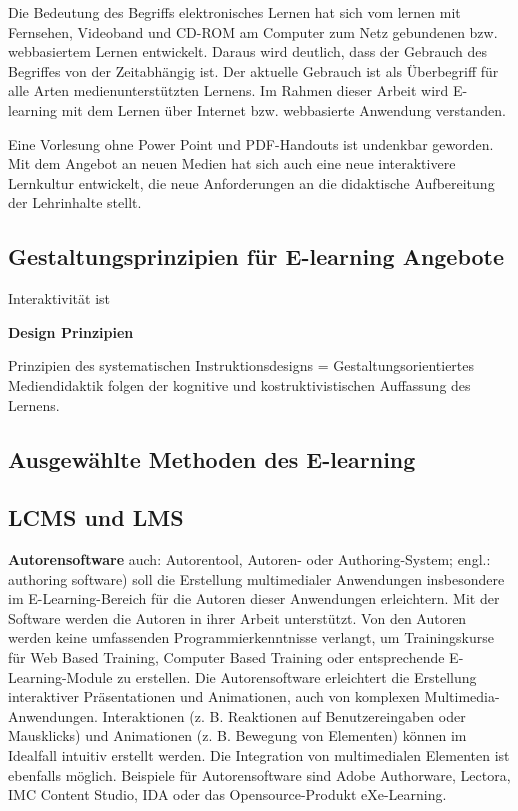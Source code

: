 \documentclass[a4paper, 12pt, twoside, BCOR=20mm, DIV=calc, abstracton, parskip=half*, toc=bibliography, toc=listof, headsepline, footsepline, headings=small, numbers=enddot]{scrreprt}
\begin{document}
	Die Bedeutung des Begriffs elektronisches Lernen hat sich vom lernen mit Fernsehen, Videoband und CD-ROM am Computer zum Netz gebundenen bzw. webbasiertem Lernen entwickelt. 
	Daraus wird deutlich, dass der Gebrauch des Begriffes von der Zeitabhängig ist. Der aktuelle Gebrauch ist als Überbegriff für alle Arten medienunterstützten Lernens.\cite[S.22 ff.]{baumgartner2002learning} Im Rahmen dieser Arbeit wird E-learning mit dem Lernen über Internet bzw. webbasierte Anwendung verstanden. 
	
	
	Eine Vorlesung ohne Power Point und PDF-Handouts ist undenkbar geworden. Mit dem Angebot an neuen Medien hat sich auch eine neue interaktivere Lernkultur entwickelt, die neue Anforderungen an die didaktische Aufbereitung der Lehrinhalte stellt. 
	
	\subsection{Gestaltungsprinzipien für E-learning Angebote}
	
	Interaktivität ist 
	
	\textbf{Design Prinzipien}
	
	Prinzipien des systematischen Instruktionsdesigns = Gestaltungsorientiertes Mediendidaktik
	folgen der kognitive und kostruktivistischen Auffassung des Lernens. 
	
	\subsection{Ausgewählte Methoden des E-learning}
	
	
	
	\subsection{\ac{LCMS} und \ac{LMS}}
	
	\textbf{Autorensoftware} auch: Autorentool, Autoren- oder Authoring-System; engl.: authoring software) soll die Erstellung multimedialer Anwendungen insbesondere im E-Learning-Bereich für die Autoren dieser Anwendungen erleichtern.
	Mit der Software werden die Autoren in ihrer Arbeit unterstützt. Von den Autoren werden keine umfassenden Programmierkenntnisse verlangt, um Trainingskurse für Web Based Training, Computer Based Training oder entsprechende E-Learning-Module zu erstellen.
	Die Autorensoftware erleichtert die Erstellung interaktiver Präsentationen und Animationen, auch von komplexen Multimedia-Anwendungen. Interaktionen (z. B. Reaktionen auf Benutzereingaben oder Mausklicks) und Animationen (z. B. Bewegung von Elementen) können im Idealfall intuitiv erstellt werden. Die Integration von multimedialen Elementen ist ebenfalls möglich.
	Beispiele für Autorensoftware sind Adobe Authorware, Lectora, IMC Content Studio, IDA oder das Opensource-Produkt eXe-Learning. %
	
\end{document}

